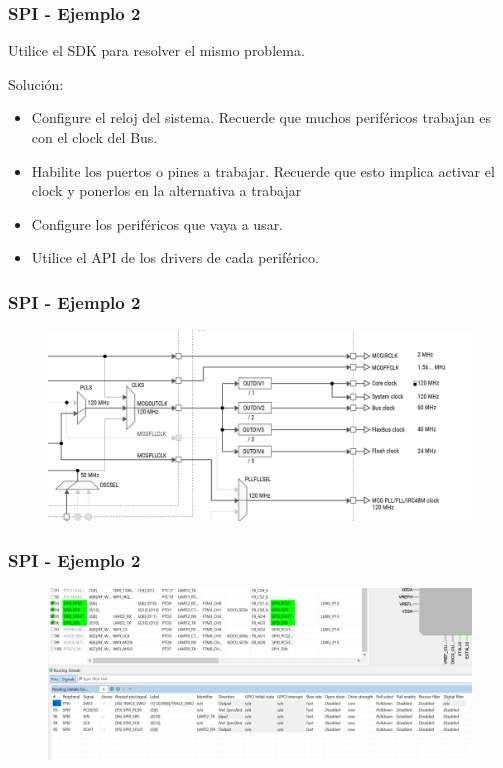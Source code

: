 \documentclass[10.5pt,scale=1.0,t,aspectratio=169,hyperref={pdfpagelabels=false}]{beamer}
\begin{document}
\begin{frame}
	\frametitle{SPI - Ejemplo 2}
	{\small
		Utilice el SDK para resolver el mismo problema. 
		
		Solución:
		
		\begin{itemize}
			\item Configure el reloj del sistema. Recuerde que muchos periféricos trabajan es con el clock del Bus.
			\item Habilite los puertos o pines a trabajar. Recuerde que esto implica activar el clock y ponerlos en la alternativa a trabajar
			\item Configure los periféricos que vaya a usar.
			\item Utilice el API de los drivers de cada periférico. 
		\end{itemize}	
	}
\end{frame}
\begin{frame}
	\frametitle{SPI - Ejemplo 2}
	\begin{figure}
		\centering
		\includegraphics[scale=0.5]{19_ClockConfig}
	\end{figure}
\end{frame}
\begin{frame}
	\frametitle{SPI - Ejemplo 2}
	\begin{figure}
		\centering
		\includegraphics[scale=0.4]{18_SPIPinActivate}
	\end{figure}
\end{frame}
\end{document}
